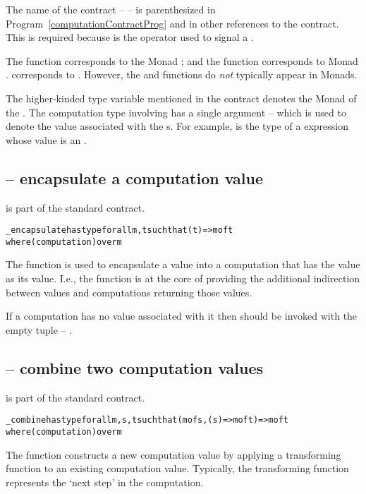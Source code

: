\begin{aside}
The name of the contract --  -- is parenthesized in Program~\vref{computationContractProg} and in other references to the contract. This is required because  is the operator used to signal a .
\end{aside}

\begin{aside}
The  function corresponds to the Monad ; and the  function corresponds to Monad .  corresponds to . However, the  and  functions do \emph{not} typically appear in Monads.
\end{aside}

The higher-kinded type variable  mentioned in the  contract denotes the Monad of the . The computation type involving  has a single argument -- which is used to denote the value associated with the s. For example,  is the type of a  expression whose value is an .

\subsection{ -- encapsulate a computation value}
\label{encapsulateFunction}
 is part of the standard  contract.
\begin{alltt}
\_encapsulate has type for all m,t such that (t)=>m of t
                       where (computation) over m
\end{alltt}
The  function is used to encapsulate a value into a computation that has the value as its value. I.e., the  function is at the core of providing the additional indirection between values and computations returning those values.

\begin{aside}
If a computation has no value associated with it then  should be invoked with the empty tuple -- \q{()}.
\end{aside}

\subsection{ -- combine two computation values}
\label{combineFunction}
 is part of the standard  contract.
\begin{alltt}
\_combine has type for all m,s,t such that (m of s, (s)=>m of t)=>m of t
                   where (computation) over m
\end{alltt}
The  function constructs a new computation value by applying a transforming function to an existing computation value. Typically, the transforming function represents the `next step' in the computation.

